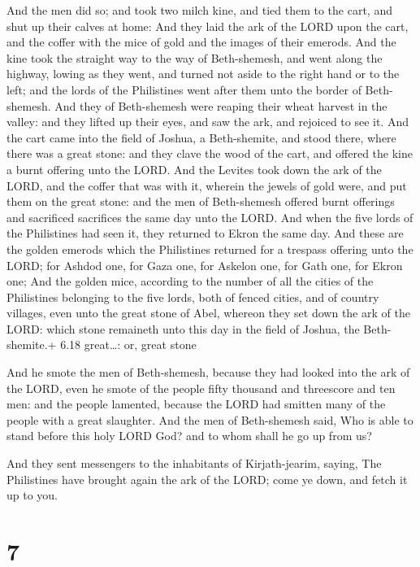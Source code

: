  And the men did so; and took two milch kine, and tied
them to the cart, and shut up their calves at home:  And
they laid the ark of the LORD upon the cart, and the coffer with the
mice of gold and the images of their emerods.  And the kine
took the straight way to the way of Beth-shemesh, and went along the
highway, lowing as they went, and turned not aside to the right hand or
to the left; and the lords of the Philistines went after them unto the
border of Beth-shemesh.  And they of Beth-shemesh were
reaping their wheat harvest in the valley: and they lifted up their
eyes, and saw the ark, and rejoiced to see it.  And the
cart came into the field of Joshua, a Beth-shemite, and stood there,
where there was a great stone: and they clave the wood of the cart, and
offered the kine a burnt offering unto the LORD.  And the
Levites took down the ark of the LORD, and the coffer that was with it,
wherein the jewels of gold were, and put them on the great stone: and
the men of Beth-shemesh offered burnt offerings and sacrificed
sacrifices the same day unto the LORD.  And when the five
lords of the Philistines had seen it, they returned to Ekron the same
day.  And these are the golden emerods which the
Philistines returned for a trespass offering unto the LORD; for Ashdod
one, for Gaza one, for Askelon one, for Gath one, for Ekron one;
 And the golden mice, according to the number of all the
cities of the Philistines belonging to the five lords, both of fenced
cities, and of country villages, even unto the great stone of Abel,
whereon they set down the ark of the LORD: which stone remaineth unto
this day in the field of Joshua, the Beth-shemite.+ 6.18 great\ldots:
or, great stone

 And he smote the men of Beth-shemesh, because they had
looked into the ark of the LORD, even he smote of the people fifty
thousand and threescore and ten men: and the people lamented, because
the LORD had smitten many of the people with a great slaughter.
 And the men of Beth-shemesh said, Who is able to stand
before this holy LORD God? and to whom shall he go up from us?

 And they sent messengers to the inhabitants of
Kirjath-jearim, saying, The Philistines have brought again the ark of
the LORD; come ye down, and fetch it up to you.

\hypertarget{section-6}{%
\section{7}\label{section-6}}

